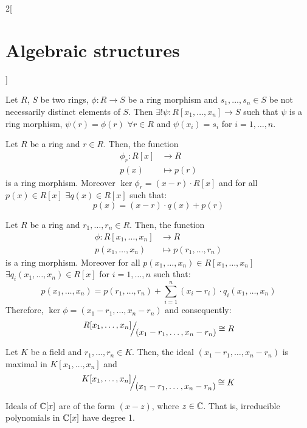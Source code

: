 \documentclass[../../../main.tex]{subfiles}
\begin{document}
\begin{multicols}{2}[\section{Algebraic structures}]
\begin{prop}
\begin{center}
\begin{minipage}{\linewidth}
                \label{theorem3}
            \end{minipage}
        \end{center}
    \end{prop}
    \begin{prop}
        Let $R$, $S$ be two rings, $\phi:R\rightarrow S$ be a ring morphism and $s_1,\ldots,s_n\in S$ be not necessarily distinct elements of $S$. Then $\exists!\psi:R[x_1,\ldots,x_n]\rightarrow S$ such that $\psi$ is a ring morphism, $\psi(r)=\phi(r)$ $\forall r\in R$ and $\psi(x_i)=s_i$ for $i=1,\ldots,n$.
    \end{prop}
    \begin{corollary}
        Let $R$ be a ring and $r\in R$. Then, the function
        \begin{align*}
            \phi_r:R[x] & \longrightarrow R \\
            p(x)        & \longmapsto p(r)
        \end{align*}
        is a ring morphism. Moreover $\ker\phi_r=(x-r)\cdot R[x]$ and for all $p(x)\in R[x]$ $\exists q(x)\in R[x]$ such that: $$p(x)=(x-r)\cdot q(x)+p(r)$$
    \end{corollary}
    \begin{corollary}
        Let $R$ be a ring and $r_1,\ldots,r_n\in R$. Then, the function
        \begin{align*}
            \phi:R[x_1,\ldots,x_n] & \longrightarrow R             \\
            p(x_1,\ldots,x_n)      & \longmapsto p(r_1,\ldots,r_n)
        \end{align*}
        is a ring morphism. Moreover for all $p(x_1,\ldots,x_n)\in R[x_1,\ldots,x_n]$ $\exists q_i(x_1,\ldots,x_n)\in R[x]$ for $i=1,\ldots,n$ such that: $$p(x_1,\ldots,x_n)=p(r_1,\ldots,r_n)+\sum_{i=1}^n(x_i-r_i)\cdot q_i(x_1,\ldots,x_n)$$ Therefore, $\ker\phi=(x_1-r_1,\ldots,x_n-r_n)$ and consequently: $$\quot{R[x_1,\ldots,x_n]}{(x_1-r_1,\ldots,x_n-r_n)}\cong R$$
    \end{corollary}
    \begin{corollary}
        Let $K$ be a field and $r_1,\ldots,r_n\in K$. Then, the ideal $(x_1-r_1,\ldots,x_n-r_n)$ is maximal in $K[x_1,\ldots,x_n]$ and $$\quot{K[x_1,\ldots,x_n]}{(x_1-r_1,\ldots,x_n-r_n)}\cong K$$
    \end{corollary}
    \begin{theorem}
        Ideals of $\mathbb{C}[x]$ are of the form $(x-z)$, where $z\in\mathbb{C}$. That is, irreducible polynomials in $\mathbb{C}[x]$ have degree 1.

\end{theorem}
\end{multicols}
\end{document}
